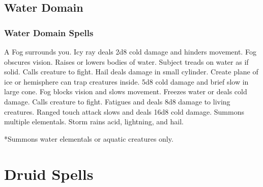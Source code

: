 \subsection{Water Domain}
\subsubsection{Water Domain Spells}
\begin{spelllist}
 A Fog surrounds you.
 Icy ray deals 2d8 cold damage and hinders movement.
 Fog obscures vision.
\spellhead[2]{}
 Raises or lowers bodies of water.
 Subject treads on water as if solid.
\spellhead[4]{}
 Calls creature to fight.
 Hail deals damage in small cylinder.
 Create plane of ice or hemisphere can trap creatures inside.
 5d8 cold damage and brief slow in large cone.
 Fog blocks vision and slows movement.
 Freezes water or deals cold damage.
 Calls creature to fight.
 Fatigues and deals 8d8 damage to living creatures.
 Ranged touch attack slows and deals 16d8 cold damage.
 Summons multiple elementals.
 Storm rains acid, lightning, and hail.
\end{spelllist}
*Summons water elementals or aquatic creatures only.


\section{Druid Spells}

